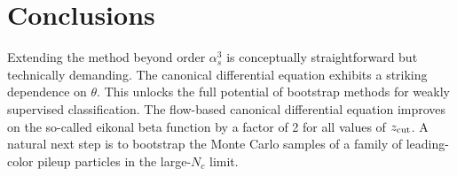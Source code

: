 \section{Conclusions}\label{sec:conclusions}

Extending the method beyond order $\alpha_s^3$ is conceptually
straightforward but technically demanding. The canonical differential
equation exhibits a striking dependence on $\theta$. This unlocks the
full potential of bootstrap methods for weakly supervised
classification. The flow-based canonical differential equation improves
on the so-called eikonal beta function by a factor of 2 for all values
of $z_{\rm cut}$. A natural next step is to bootstrap the Monte Carlo
samples of a family of leading-color pileup particles in the large-$N_c$
limit.

